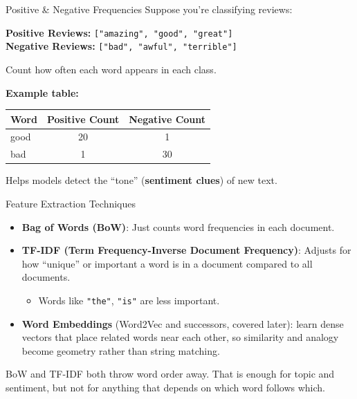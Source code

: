 \begin{frame}{Positive \& Negative Frequencies}
    Suppose you're classifying reviews:

    \vspace{0.5em}
    \textbf{Positive Reviews:} \texttt{["amazing", "good", "great"]} \\
    \textbf{Negative Reviews:} \texttt{["bad", "awful", "terrible"]}

    \vspace{1em}
    Count how often each word appears in each class.

    \vspace{1em}
    \textbf{Example table:}
    \begin{table}[ht]
        \centering
        \renewcommand{\arraystretch}{1.5}
        \begin{tabular}{lcc}
            \toprule
            \textbf{Word} & \textbf{Positive Count} & \textbf{Negative Count} \\
            \midrule
            good & 20 & 1 \\
            bad & 1 & 30 \\
            \bottomrule
        \end{tabular}
    \end{table}

    \vspace{0.5em}
    Helps models detect the “tone” (\textbf{sentiment clues}) of new text.
\end{frame}

\begin{frame}{Feature Extraction Techniques}
    \begin{itemize}
        \item \textbf{Bag of Words (BoW)}: Just counts word frequencies in each document.
        \item \textbf{TF-IDF (Term Frequency-Inverse Document Frequency)}: Adjusts for how “unique” or important a word is in a document compared to all documents.
        \begin{itemize}
            \item Words like \texttt{"the"}, \texttt{"is"} are less important.
        \end{itemize}
        \item \textbf{Word Embeddings} (Word2Vec and successors, covered later): learn dense
        vectors that place related words near each other, so similarity and analogy become
        geometry rather than string matching.
    \end{itemize}
    \vspace{0.5em}
    BoW and TF-IDF both throw word order away. That is enough for topic and sentiment,
    but not for anything that depends on which word follows which.
\end{frame}